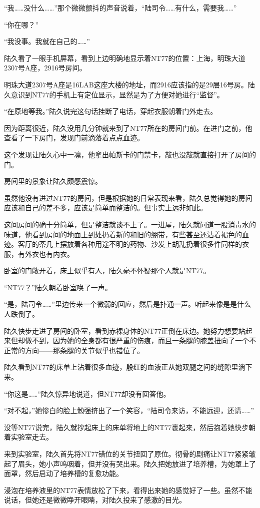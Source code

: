 “我……没什么……”那个微微颤抖的声音说着，“陆司令……有什么，需要我……”

“你在哪？”

“我没事。我就在自己的……”

陆久看了一眼手机屏幕，看到上边明确地显示着NT77的位置：上海，明珠大道2307号A座，2916号房间。

明珠大道2307号A座是16LAB这座大楼的地址，而2916应该指的是29层16号房。陆久意识到NT77的手机上有定位显示，显然是为了方便对她进行“监督”。

“在原地等我。”陆久说完这句话挂断了电话，穿起衣服朝着门外走去。

因为距离很近，陆久没用几分钟就来到了NT77所在的房间门前。在进门之前，他查看了一下房门，发现门前滴落着点点血迹。

这个发现让陆久心中一凛，他拿出帕斯卡的门禁卡，敲也没敲就直接打开了房间的门。

房间里的景象让陆久颇感震惊。

虽然他没有进过NT77的房间，但是根据她的日常表现来看，陆久总觉得她的房间应该和自己的差不多，应该是简单而整洁的。但事实上远非如此。

这间房间的确十分简单，但是整洁就谈不上了。一进屋，陆久就问道一股消毒水的味道，他看到房间的地面上到处扔着新的和旧的绷带，有些甚至还沾着褐色的血迹。客厅的茶几上摆放着各种用途不明的药物、沙发上胡乱扔着很多件同样的衣服，有外衣也有内衣。

卧室的门敞开着，床上似乎有人，陆久毫不怀疑那个人就是NT77。

“NT77？”陆久朝着卧室唤了一声。

“是，陆司令……”里边传来一个微弱的回应，然后是扑通一声。听起来像是是什么人跌倒了。

陆久快步走进了房间的卧室，看到赤裸身体的NT77正倒在床边。她努力想要站起来但却做不到，因为她的全身都有很严重的伤痕，而且一条腿的膝盖扭向了一个不正常的方向——那条腿的关节似乎也错位了。

陆久看到NT77的床单上沾着很多血迹，殷红的血液正从她双腿之间的缝隙里淌下来。

“你这是……”陆久惊异地说道，但NT77却没有回答他。

“对不起，”她惨白的脸上勉强挤出了一个笑容，“陆司令来访，不能远迎，还请……”

没等NT77说完，陆久就抄起床上的床单将地上的NT77裹起来，然后抱着她快步朝着实验室走去。

来到实验室，陆久首先将NT77错位的关节扭回了原位。彻骨的剧痛让NT77紧紧皱起了眉头，她小声呜咽着，但并没有哭出来。陆久把她放进了培养槽，为她罩上了面罩，然后启动了培养槽的复愈功能。

浸泡在培养液里的NT77表情放松了下来，看得出来她的感觉好了一些。虽然不能说话，但她还是微微睁开眼睛，对陆久投来了感激的目光。

